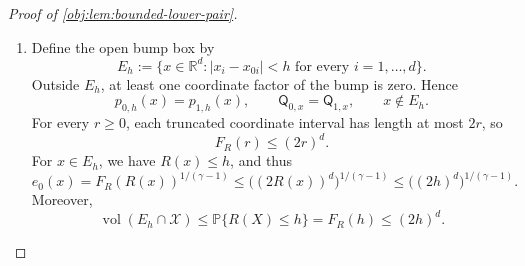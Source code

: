 \documentclass[11pt]{article}
\begin{document}
\begin{proof}[Proof of \cref{obj:lem:bounded-lower-pair}]
\begin{enumerate}
The control parameters agree, so the control contribution to entropy
is zero. The treated contribution satisfies the preceding quadratic
bound. Conditioning on the binary treatment therefore gives
\[
\begin{aligned}
\operatorname{KL}(\mathsf V_{0,x},\mathsf V_{1,x})
&=(1-e_0(x))
  \operatorname{KL}\!\left(
  \operatorname{Bernoulli}(\theta_0),
  \operatorname{Bernoulli}(\theta_0)\right)\\
&\quad+
e_0(x)\operatorname{KL}\!\left(
\operatorname{Bernoulli}(p_{0,h}(x)),
\operatorname{Bernoulli}(p_{1,h}(x))\right)\\
&\le \frac{2}{\theta_0}(ah^\beta)^2e_0(x).
\end{aligned}
\]
Applying entropy contraction first to recording the covariate and then
to scaling the binary outcome yields
\[
\operatorname{KL}(\mathsf Q_{0,x},\mathsf Q_{1,x})
\le
\operatorname{KL}(\mathsf W_{0,x},\mathsf W_{1,x})
\le
\operatorname{KL}(\mathsf V_{0,x},\mathsf V_{1,x})
\le
\frac{2}{\theta_0}(ah^\beta)^2e_0(x).
\]
In particular, the conditional entropies are finite.

\item Define the open bump box by
\[
E_h:=\{x\in\mathbb R^d:|x_i-x_{0i}|<h
\text{ for every }i=1,\ldots,d\}.
\]
Outside \(E_h\), at least one coordinate factor of the bump is zero.
Hence
\[
p_{0,h}(x)=p_{1,h}(x),
\qquad
\mathsf Q_{0,x}=\mathsf Q_{1,x},
\qquad x\notin E_h.
\]
For every \(r\ge0\), each truncated coordinate interval has length at
most \(2r\), so
\[
F_R(r)\le(2r)^d.
\]
For \(x\in E_h\), we have \(R(x)\le h\), and thus
\[
e_0(x)
=F_R(R(x))^{1/(\gamma-1)}
\le \bigl((2R(x))^d\bigr)^{1/(\gamma-1)}
\le \bigl((2h)^d\bigr)^{1/(\gamma-1)}.
\]
Moreover,
\[
\operatorname{vol}(E_h\cap\mathcal X)
\le\mathbb P\{R(X)\le h\}
=F_R(h)
\le(2h)^d.
\]


\end{enumerate}
\end{proof}
\end{document}
